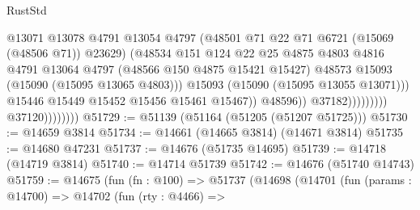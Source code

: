 \begin{lexlean}{RustStd}
\begin{coremodule}
                                                @13071
                                                @13078
                                                @4791
                                                @13054
                                                @4797
                                                (@48501
                                                  @71
                                                  @22
                                                  @71
                                                  @6721
                                                  (@15069 (@48506 @71))
                                                  @23629)
                                                (@48534
                                                  @151
                                                  @124
                                                  @22
                                                  @25
                                                  @4875
                                                  @4803
                                                  @4816
                                                  @4791
                                                  @13064
                                                  @4797
                                                  (@48566 @150 @4875 @15421 @15427)
                                                  @48573
                                                  @15093
                                                  (@15090 (@15095 @13065 @4803)))
                                                @15093
                                                (@15090 (@15095 @13055 @13071)))
                                              @15446
                                              @15449
                                              @15452
                                              @15456
                                              @15461
                                              @15467))
                                          @48596))
                                      @37182)))))))))
                    @37120))))))))
@51729 := @51139 (@51164 (@51205 (@51207 @51725)))
@51730 := @14659 @3814
@51734 := @14661 (@14665 @3814) (@14671 @3814)
@51735 := @14680 @47231
@51737 := @14676 (@51735 @14695)
@51739 := @14718 (@14719 @3814)
@51740 := @14714 @51739
@51742 := @14676 (@51740 @14743)
@51759 := @14675
    (fun (fn : @100) =>
    @51737
      (@14698
        (@14701
          (fun (params : @14700) =>
          @14702
            (fun (rty : @4466) =>

\end{coremodule}
\end{lexlean}
